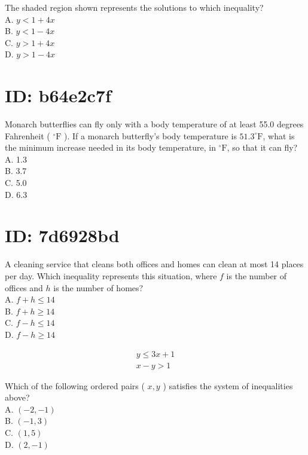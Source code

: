 The shaded region shown represents the solutions to which inequality?\\
A. $y<1+4 x$\\
B. $y<1-4 x$\\
C. $y>1+4 x$\\
D. $y>1-4 x$

\section*{ID: b64e2c7f}
Monarch butterflies can fly only with a body temperature of at least 55.0 degrees Fahrenheit ( ${ }^{\circ} \mathrm{F}$ ). If a monarch butterfly's body temperature is $51.3^{\circ} \mathrm{F}$, what is the minimum increase needed in its body temperature, in ${ }^{\circ} \mathrm{F}$, so that it can fly?\\
A. 1.3\\
B. 3.7\\
C. 5.0\\
D. 6.3

\section*{ID: 7d6928bd}
A cleaning service that cleans both offices and homes can clean at most 14 places per day. Which inequality represents this situation, where $f$ is the number of offices and $h$ is the number of homes?\\
A. $f+h \leq 14$\\
B. $f+h \geq 14$\\
C. $f-h \leq 14$\\
D. $f-h \geq 14$

$$
\begin{array}{r}
y \leq 3 x+1 \\
x-y>1
\end{array}
$$

Which of the following ordered pairs ( $x, y$ ) satisfies the system of inequalities above?\\
A. $(-2,-1)$\\
B. $(-1,3)$\\
C. $(1,5)$\\
D. $(2,-1)$


